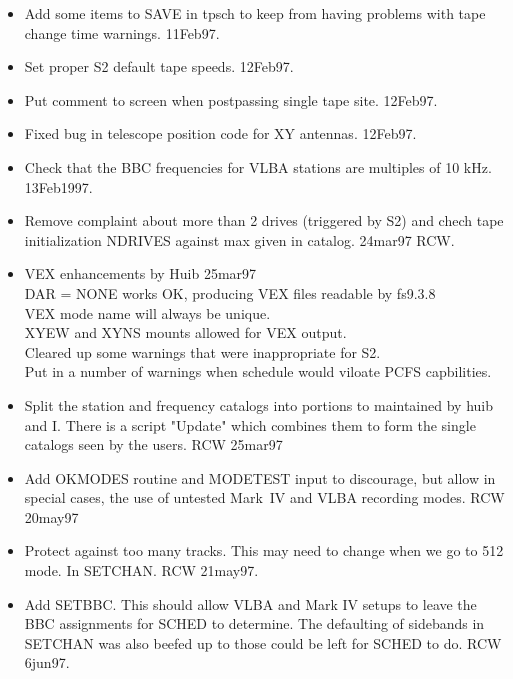 \documentclass{report}
\begin{document}
\begin{itemize}

\item Add some items to SAVE in tpsch to keep from having problems
      with tape change time warnings.  11Feb97.

\item Set proper S2 default tape speeds. 12Feb97.

\item Put comment to screen when postpassing single tape site. 12Feb97.

\item Fixed bug in telescope position code for XY antennas. 12Feb97.

\item Check that the BBC frequencies for VLBA stations are
      multiples of 10 kHz.  13Feb1997.

\item Remove complaint about more than 2 drives (triggered by S2) and
      chech tape initialization NDRIVES against max given in catalog.
      24mar97 RCW.

\item VEX enhancements by Huib 25mar97 \\
      DAR = NONE works OK, producing VEX files readable by fs9.3.8 \\
      VEX mode name will always be unique. \\
      XYEW and XYNS mounts allowed for VEX output. \\
      Cleared up some warnings that were inappropriate for S2. \\
      Put in a number of warnings when schedule would viloate PCFS capbilities.

\item Split the station and frequency catalogs into portions to
      maintained by huib and I.  There is a script "Update" which
      combines them to form the single catalogs seen by the users.
      RCW 25mar97

\item Add OKMODES routine and MODETEST input to discourage, but allow
      in special cases, the use of untested Mark~IV and VLBA
      recording modes.
      RCW 20may97

\item Protect against too many tracks.  This may need to change
      when we go to 512 mode.  In SETCHAN.  RCW 21may97.

\item Add SETBBC.  This should allow VLBA and Mark IV setups to leave
      the BBC assignments for SCHED to determine.  The defaulting of
      sidebands in SETCHAN was also beefed up to those could be left
      for SCHED to do.   RCW  6jun97.


\end{itemize}
\end{document}
